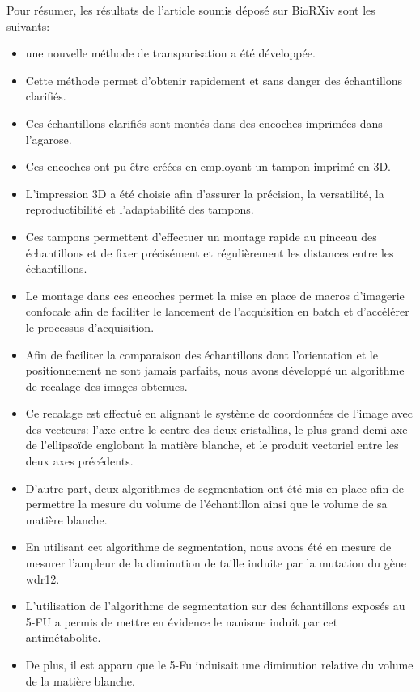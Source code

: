 \documentclass[\main/main.tex]{subfiles}
\begin{document}
%
Pour résumer, les résultats de l'article soumis déposé sur BioRXiv sont les suivants: 
\begin{itemize}
    \item 
    une nouvelle méthode de transparisation a été développée.
    
    \item
    Cette méthode permet d'obtenir rapidement et sans danger des échantillons clarifiés.
    
    \item
    Ces échantillons clarifiés sont montés dans des encoches imprimées dans l'agarose.
    
    \item
    Ces encoches ont pu être créées en employant un tampon imprimé en 3D.
    
    \item
    L'impression 3D a été choisie afin d'assurer la précision, la versatilité, la reproductibilité et l'adaptabilité des tampons.
    
    \item 
    Ces tampons permettent d'effectuer un montage rapide au pinceau des échantillons et de fixer précisément et régulièrement
    les distances entre les échantillons.
    
    \item
    Le montage dans ces encoches permet la mise en place de macros d'imagerie confocale afin de faciliter le lancement de l'acquisition en batch et d'accélérer le processus d'acquisition.
    
    \item
    Afin de faciliter la comparaison des échantillons dont l'orientation et le positionnement ne sont jamais parfaits, nous avons développé un algorithme de recalage des images obtenues.
    
    \item
    Ce recalage est effectué en alignant le système de coordonnées de l'image avec des vecteurs: l'axe entre le centre des deux cristallins, le plus grand demi-axe de l'ellipsoïde englobant la matière blanche, et le produit vectoriel entre les deux axes précédents.
    
    \item
    D'autre part, deux algorithmes de segmentation ont été mis en place afin de permettre la mesure du volume de l'échantillon ainsi que le volume de sa matière blanche.
    
    \item
    En utilisant cet algorithme de segmentation, nous avons été en mesure de mesurer
    l'ampleur de la diminution de taille induite par la mutation du gène wdr12.
    
    \item
    L'utilisation de l'algorithme de segmentation sur des échantillons exposés au 5-FU
    a permis de mettre en évidence le nanisme induit par cet antimétabolite. 
    
    \item
    De plus, il est apparu que le 5-Fu induisait une diminution relative du volume de la matière blanche.
    
\end{itemize}
\end{document}
